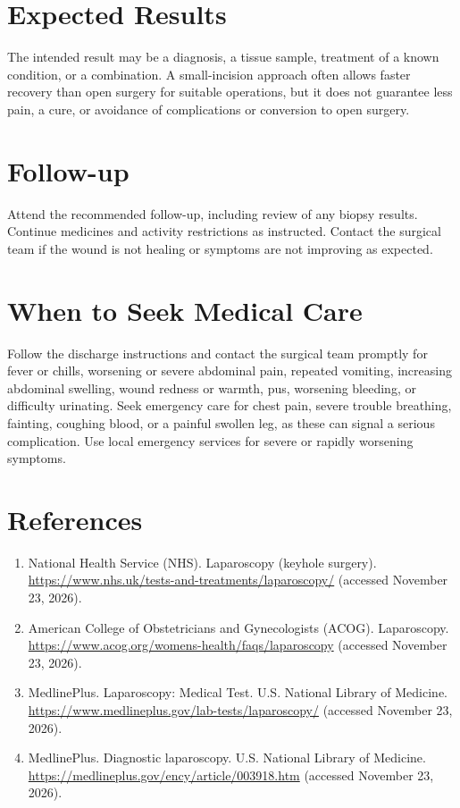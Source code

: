\section*{Expected Results}
The intended result may be a diagnosis, a tissue sample, treatment of a known condition, or a combination. A small-incision approach often allows faster recovery than open surgery for suitable operations, but it does not guarantee less pain, a cure, or avoidance of complications or conversion to open surgery.

\section*{Follow-up}
Attend the recommended follow-up, including review of any biopsy results. Continue medicines and activity restrictions as instructed. Contact the surgical team if the wound is not healing or symptoms are not improving as expected.

\section*{When to Seek Medical Care}
Follow the discharge instructions and contact the surgical team promptly for fever or chills, worsening or severe abdominal pain, repeated vomiting, increasing abdominal swelling, wound redness or warmth, pus, worsening bleeding, or difficulty urinating. Seek emergency care for chest pain, severe trouble breathing, fainting, coughing blood, or a painful swollen leg, as these can signal a serious complication. Use local emergency services for severe or rapidly worsening symptoms.

\section*{References}
\begin{enumerate}
  \item National Health Service (NHS). Laparoscopy (keyhole surgery). \url{https://www.nhs.uk/tests-and-treatments/laparoscopy/} (accessed November 23, 2026).
  \item American College of Obstetricians and Gynecologists (ACOG). Laparoscopy. \url{https://www.acog.org/womens-health/faqs/laparoscopy} (accessed November 23, 2026).
  \item MedlinePlus. Laparoscopy: Medical Test. U.S. National Library of Medicine. \url{https://www.medlineplus.gov/lab-tests/laparoscopy/} (accessed November 23, 2026).
  \item MedlinePlus. Diagnostic laparoscopy. U.S. National Library of Medicine. \url{https://medlineplus.gov/ency/article/003918.htm} (accessed November 23, 2026).
\end{enumerate}

\clearpage
